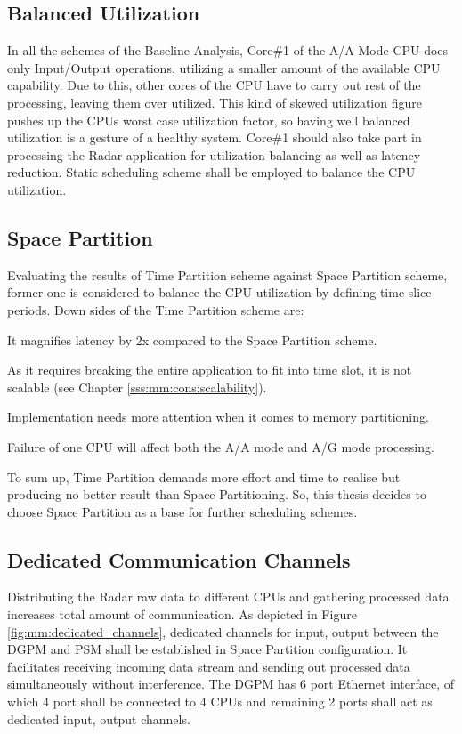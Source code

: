 \subsection{Balanced Utilization}
In all the schemes of the Baseline Analysis, Core\#1 of the A/A Mode CPU does only Input/Output operations, utilizing a smaller amount of the available CPU capability. Due to this, other cores of the CPU have to carry out rest of the processing, leaving them over utilized. This kind of skewed utilization figure pushes up the CPUs worst case utilization factor, so having well balanced utilization is a gesture of a healthy system. Core\#1 should also take part in processing the Radar application for utilization balancing as well as latency reduction. Static scheduling scheme shall be employed to balance the CPU utilization. \vspace*{0.2cm}

\subsection{Space Partition}
Evaluating the results of Time Partition scheme against Space Partition scheme, former one is considered to balance the CPU utilization by defining time slice periods. Down sides of the Time Partition scheme are:
\begin{compactitem} 
\item It magnifies latency by 2x compared to the Space Partition scheme.
\item As it requires breaking the entire application to fit into time slot, it is not scalable (see Chapter \ref{sss:mm:cons:scalability}).
\item Implementation needs more attention when it comes to memory partitioning.
\item Failure of one CPU will affect both the A/A mode and A/G mode processing.
\end{compactitem} 
\vspace*{0.2cm}
To sum up, Time Partition demands more effort and time to realise but producing no better result than Space Partitioning. So, this thesis decides to choose Space Partition as a base for further scheduling schemes.

\subsection{Dedicated Communication Channels}
Distributing the Radar raw data to different CPUs and gathering processed data increases total amount of communication. As depicted in Figure \ref{fig:mm:dedicated_channels}, dedicated channels for input, output between the DGPM and PSM shall be established in Space Partition configuration. It facilitates receiving incoming data stream and sending out processed data simultaneously without interference. The DGPM has 6 port Ethernet interface, of which 4 port shall be connected to 4 CPUs and remaining 2 ports shall act as dedicated input, output channels.

